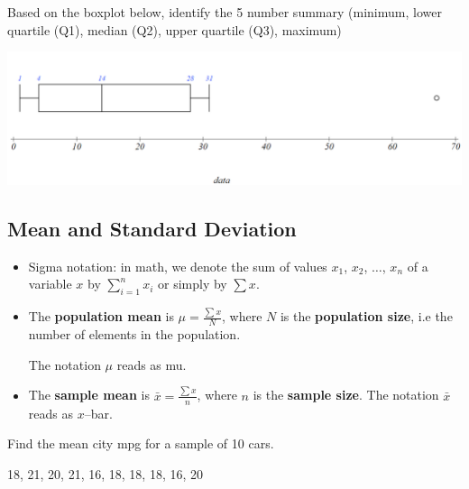 \begin{exercise}

Based on the boxplot below, identify the 5 number summary (minimum,
lower quartile (Q1), median (Q2), upper quartile (Q3), maximum)
\begin{fullwidth}
  \begin{center}
    \includegraphics[width=0.9\linewidth]{Figures/Summary-Boxplot.png}
  \end{center}
\end{fullwidth}

\end{exercise}
\vspace*{6\baselineskip}

\hypertarget{mean-and-standard-deviation}{%
\subsection{Mean and Standard
Deviation}\label{mean-and-standard-deviation}}

\begin{itemize}
\item
  Sigma notation: in math, we denote the sum of values \(x_1\), \(x_2\),
  \(\dots\), \(x_n\) of a variable \(x\) by \(\sum\limits_{i=1}^n x_i\)
  or simply by \(\sum x\).
\item
  The \textbf{population mean} is \(\mu= \frac{\sum x}{N}\), where \(N\)
  is the \textbf{population size}, i.e the number of elements in the
  population.

  The notation \(\mu\) reads as mu.
\item
  The \textbf{sample mean} is \(\bar{x}=\frac{\sum{x}}{n}\), where \(n\)
  is the \textbf{sample size}. The notation \(\bar{x}\) reads as
  \(x\)--bar.
\end{itemize}

\begin{example}

Find the mean city mpg for a sample of 10 cars.

18, 21, 20, 21, 16, 18, 18, 18, 16, 20

\end{example}
\vspace*{6\baselineskip}

